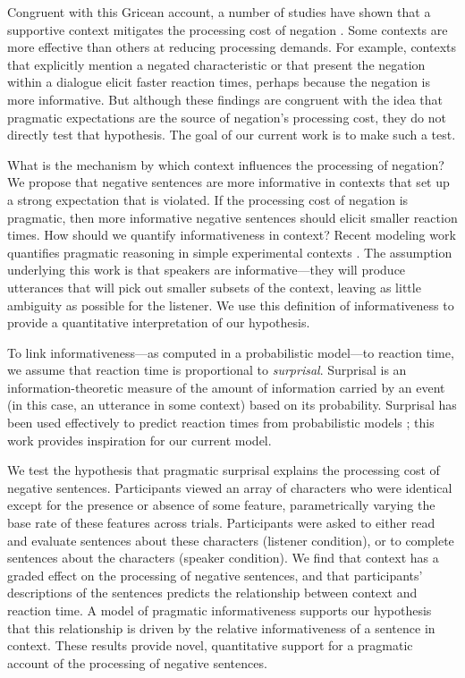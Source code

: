 \documentclass[man]{apa2}
\begin{document}
Congruent with this Gricean account, a number of studies have shown that a supportive context mitigates the processing cost of negation \cite{wason1965, glenberg1999, ludtke2006, nieuwland2008, dale2011}. Some contexts are more effective than others at reducing processing demands. For example, contexts that explicitly mention a negated characteristic \cite{ludtke2006} or that present the negation within a dialogue \cite{dale2011} elicit faster reaction times, perhaps because the negation is more informative.  But although these findings are congruent with the idea that pragmatic expectations are the source of negation's processing cost, they do not directly test that hypothesis.  The goal of our current work is to make such a test.

What is the mechanism by which context influences the processing of negation?  We propose that negative sentences are more informative in contexts that set up a strong expectation that is violated. If the processing cost of negation is pragmatic, then more informative negative sentences should elicit smaller reaction times. How should we quantify informativeness in context? Recent modeling work quantifies pragmatic reasoning in simple experimental contexts \cite{frank2012,goodman2013}. The assumption underlying this work is that speakers are informative---they will produce utterances that will pick out smaller subsets of the context, leaving as little ambiguity as possible for the listener.  We use this definition of informativeness to provide a quantitative interpretation of our hypothesis.

To link informativeness---as computed in a probabilistic model---to reaction time, we assume that reaction time is proportional to \emph{surprisal}. Surprisal is an information-theoretic measure of the amount of information carried by an event (in this case, an utterance in some context) based on its probability. Surprisal has been used effectively to predict reaction times from probabilistic models \cite{levy2008}; this work provides inspiration for our current model. 

We test the hypothesis that pragmatic surprisal explains the processing cost of negative sentences.  Participants viewed an array of characters who were identical except for the presence or absence of some feature, parametrically varying the base rate of these features across trials.  Participants were asked to either read and evaluate sentences about these characters (listener condition), or to complete sentences about the characters (speaker condition).  We find that context has a graded effect on the processing of negative sentences, and that participants' descriptions of the sentences predicts the relationship between context and reaction time.  A model of pragmatic informativeness supports our hypothesis that this relationship is driven by the relative informativeness of a sentence in context.  These results provide novel, quantitative support for a pragmatic account of the processing of negative sentences.
\end{document}
